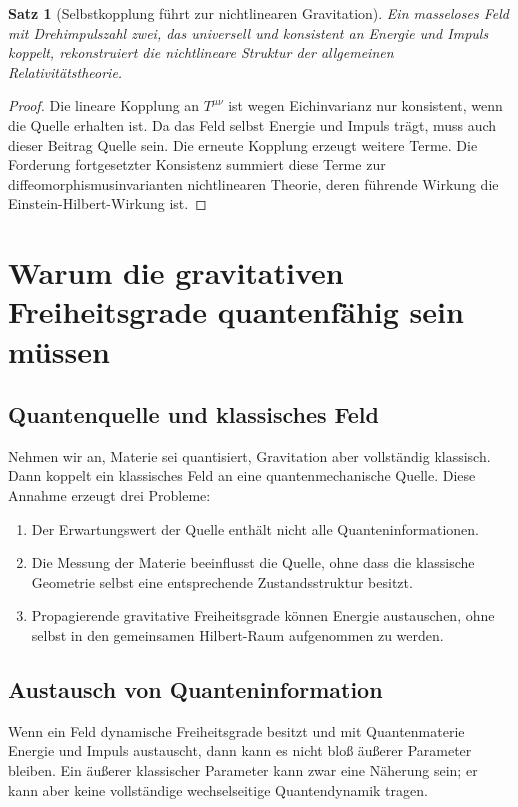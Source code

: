 \documentclass[11pt,a4paper,openany]{book}
\newtheorem{satz}{Satz}[chapter]
\theoremstyle{remark}
\begin{document}
\begin{satz}[Selbstkopplung führt zur nichtlinearen Gravitation]
Ein masseloses Feld mit Drehimpulszahl zwei, das universell und konsistent an Energie und Impuls koppelt, rekonstruiert die nichtlineare Struktur der allgemeinen Relativitätstheorie.
\end{satz}
\begin{proof}
Die lineare Kopplung an $T^{\mu\nu}$ ist wegen Eichinvarianz nur konsistent, wenn die Quelle erhalten ist. Da das Feld selbst Energie und Impuls trägt, muss auch dieser Beitrag Quelle sein. Die erneute Kopplung erzeugt weitere Terme. Die Forderung fortgesetzter Konsistenz summiert diese Terme zur diffeomorphismusinvarianten nichtlinearen Theorie, deren führende Wirkung die Einstein-Hilbert-Wirkung ist.
\end{proof}

\chapter{Warum die gravitativen Freiheitsgrade quantenfähig sein müssen}
\section{Quantenquelle und klassisches Feld}
Nehmen wir an, Materie sei quantisiert, Gravitation aber vollständig klassisch. Dann koppelt ein klassisches Feld an eine quantenmechanische Quelle. Diese Annahme erzeugt drei Probleme:
\begin{enumerate}
\item Der Erwartungswert der Quelle enthält nicht alle Quanteninformationen.
\item Die Messung der Materie beeinflusst die Quelle, ohne dass die klassische Geometrie selbst eine entsprechende Zustandsstruktur besitzt.
\item Propagierende gravitative Freiheitsgrade können Energie austauschen, ohne selbst in den gemeinsamen Hilbert-Raum aufgenommen zu werden.
\end{enumerate}

\section{Austausch von Quanteninformation}
Wenn ein Feld dynamische Freiheitsgrade besitzt und mit Quantenmaterie Energie und Impuls austauscht, dann kann es nicht bloß äußerer Parameter bleiben. Ein äußerer klassischer Parameter kann zwar eine Näherung sein; er kann aber keine vollständige wechselseitige Quantendynamik tragen.
\end{document}

